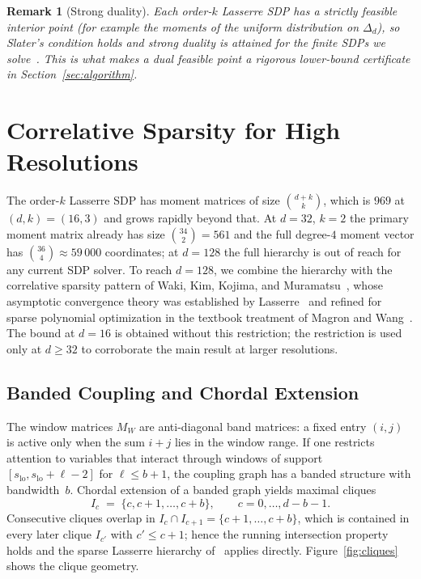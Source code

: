 \documentclass[11pt, letterpaper]{article}
\theoremstyle{paperplain}
\theoremstyle{paperdef}
\newtheorem{remark}[theorem]{Remark}
\begin{document}
\begin{remark}[Strong duality]
Each order-$k$ Lasserre SDP has a strictly feasible interior point
(for example the moments of the uniform distribution on $\Delta_d$),
so Slater's condition holds and strong duality is attained for the
finite SDPs we solve~\cite[\S 5.2]{BoydVandenberghe2004}.  This is what
makes a dual feasible point a rigorous lower-bound certificate
in Section~\ref{sec:algorithm}.
\end{remark}


\section{Correlative Sparsity for High Resolutions}\label{sec:sparsity}

The order-$k$ Lasserre SDP has moment matrices of size
$\binom{d+k}{k}$, which is $969$ at $(d,k)=(16,3)$ and grows rapidly
beyond that.  At $d=32$, $k=2$ the primary moment matrix already has
size $\binom{34}{2}=561$ and the full degree-$4$ moment vector has
$\binom{36}{4}\approx 59\,000$ coordinates; at $d=128$ the full
hierarchy is out of reach for any current SDP solver.  To reach
$d=128$, we combine the hierarchy with the correlative sparsity
pattern of Waki, Kim, Kojima, and Muramatsu~\cite{Waki2006}, whose
asymptotic convergence theory was established by
Lasserre~\cite{Lasserre2006sparse} and refined for sparse polynomial
optimization in the textbook treatment of Magron and
Wang~\cite{MagronWang2023}.  The bound at $d=16$ is obtained without
this restriction; the restriction is used only at $d\ge 32$ to
corroborate the main result at larger resolutions.

\subsection{Banded Coupling and Chordal Extension}

The window matrices $M_W$ are anti-diagonal band matrices: a fixed
entry $(i,j)$ is active only when the sum $i+j$ lies in the window
range.  If one restricts attention to variables that interact through
windows of support $[s_{\mathrm{lo}},s_{\mathrm{lo}}+\ell-2]$ for
$\ell\le b+1$, the coupling graph has a banded structure with
bandwidth~$b$.  Chordal extension of a banded graph yields maximal
cliques
\[
  I_c \;=\; \{c, c+1, \ldots, c+b\},
  \qquad c=0,\ldots,d-b-1.
\]
Consecutive cliques overlap in $I_c\cap I_{c+1}=\{c+1,\ldots,c+b\}$,
which is contained in every later clique $I_{c'}$ with $c'\le c+1$;
hence the running intersection property holds and the sparse
Lasserre hierarchy of~\cite{Waki2006} applies directly.
Figure~\ref{fig:cliques} shows the clique geometry.
\end{document}
